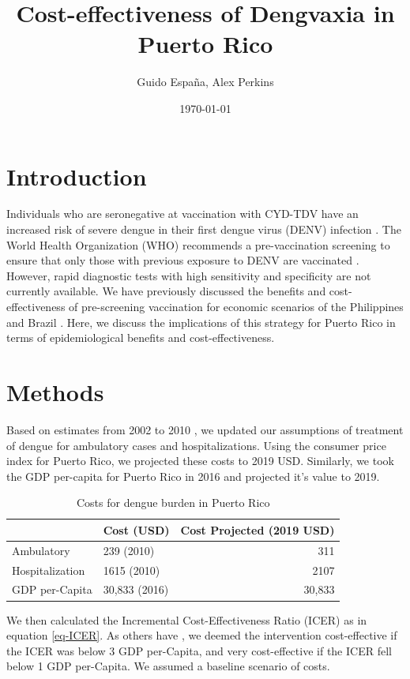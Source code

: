 \documentclass[12pt]{article}\usepackage[]{graphicx}\usepackage[]{color}
\author{Guido España, Alex Perkins}
\date{\today}
\title{Cost-effectiveness of Dengvaxia in Puerto Rico}
\newcommand{\R}[1]{\label{#1}\linelabel{#1}}
\begin{document}
\maketitle
\linenumbers
 
\section{Introduction}
Individuals who are seronegative at vaccination with CYD-TDV have an increased risk of severe dengue in their first dengue virus (DENV) infection \cite{Sridhar2018}. The World Health Organization (WHO) recommends a pre-vaccination screening to ensure that only those with previous exposure to DENV are vaccinated \cite{WHO2018}. However, rapid diagnostic tests with high sensitivity and specificity are not currently available. We have previously discussed the benefits and cost-effectiveness of pre-screening vaccination for economic scenarios of the Philippines and Brazil \cite{Espana2019Biorxiv}. Here, we discuss the implications of this strategy for Puerto Rico in terms of epidemiological benefits and cost-effectiveness.


\section{Methods}
Based on estimates from 2002 to 2010 \cite{Halasa2012}, we updated our assumptions of treatment of dengue for ambulatory cases and hospitalizations. Using the consumer price index for Puerto Rico, we projected these costs to 2019 USD. Similarly, we took the GDP per-capita for Puerto Rico in 2016 \cite{worldbank2016} and projected it's value to 2019. 

\begin{table}
  \begin{center}
    \begin{tabular}{|l|l|r|}
      \hline
      & Cost (USD) & Cost Projected (2019 USD)\\
      \hline
      Ambulatory & 239 (2010) & 311\\
      Hospitalization & 1615 (2010) & 2107\\
      GDP per-Capita & 30,833 (2016) & 30,833\\
      \hline
    \end{tabular}
  \end{center}
  \caption{Costs for dengue burden in Puerto Rico}
  \label{tbl-costs}
\end{table}


We then calculated the Incremental Cost-Effectiveness Ratio (ICER) as in equation \ref{eq-ICER}. \R{Rev1Com2} As others have \cite{shim2017,shim2017b,flasche2016}, we deemed the intervention cost-effective if the ICER was below 3 GDP per-Capita, and very cost-effective if the ICER fell below 1 GDP per-Capita. We assumed a baseline scenario of costs.
\end{document}
